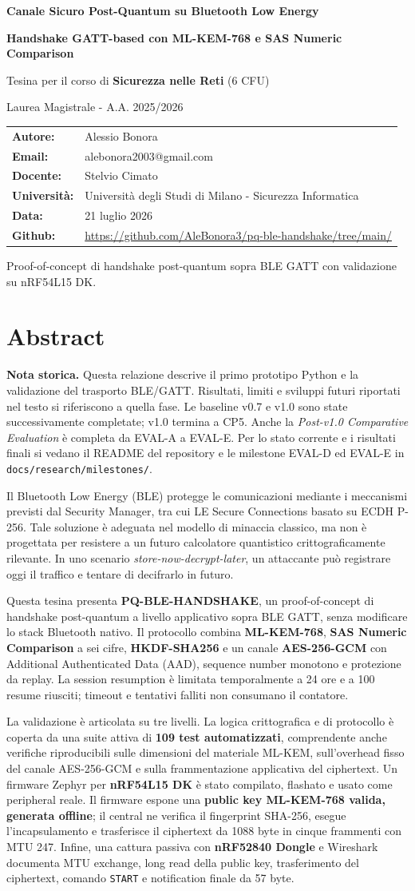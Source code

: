 \documentclass[11pt,a4paper]{article}
\makeatletter
\newcommand{\Course}{Sicurezza nelle Reti}
\newcommand{\Professor}{Stelvio Cimato}
\newcommand{\University}{Universit\`a degli Studi di Milano - Sicurezza Informatica}
\newcommand{\AcademicYear}{2025/2026}
\newcommand{\Student}{Alessio Bonora}
\newcommand{\StudentEmail}{alebonora2003@gmail.com}
\newcommand{\ProjectTitle}{Canale Sicuro Post-Quantum su Bluetooth Low Energy}
\newcommand{\ProjectSubtitle}{Handshake GATT-based con ML-KEM-768 e SAS Numeric Comparison}
\newcommand{\ProjectDate}{21 luglio 2026}
\newcommand{\ProjectRepo}{\url{https://github.com/AleBonora3/pq-ble-handshake/tree/main/}}
\newcommand{\makeprojecttitle}{%
\begin{titlepage}
  \centering
  \vspace*{1.5cm}
  {\Huge\bfseries\color{Primary}\ProjectTitle\par}
  \vspace{0.5cm}
  {\Large\bfseries\ProjectSubtitle\par}
  \vspace{1.4cm}
  {\large Tesina per il corso di \textbf{\Course} (6 CFU)\par}
  \vspace{0.2cm}
  {\large Laurea Magistrale - A.A. \AcademicYear\par}
  \vspace{1.2cm}
  \begin{tcolorbox}[width=0.82\textwidth,colback=SoftBg,colframe=Primary!45]
    \begin{tabularx}{\textwidth}{@{}lX@{}}
      \textbf{Autore:} & \Student \\
      \textbf{Email:} & \StudentEmail \\
      \textbf{Docente:} & \Professor \\
      \textbf{Universit\`a:} & \University \\
      \textbf{Data:} & \ProjectDate \\
      \textbf{Github:} & \ProjectRepo \\
    \end{tabularx}
  \end{tcolorbox}
  \vfill
  {\small Proof-of-concept di handshake post-quantum sopra BLE GATT con validazione su nRF54L15 DK.\par}
\end{titlepage}
}
\makeatother
\begin{document}
\makeprojecttitle
{}
\section*{Abstract}

\noindent\textbf{Nota storica.} Questa relazione descrive il primo prototipo
Python e la validazione del trasporto BLE/GATT. Risultati, limiti e sviluppi
futuri riportati nel testo si riferiscono a quella fase. Le baseline v0.7 e
v1.0 sono state successivamente completate; v1.0 termina a CP5. Anche la
\emph{Post-v1.0 Comparative Evaluation} è completa da EVAL-A a EVAL-E.
Per lo stato corrente e i risultati finali si vedano il README del repository
e le milestone EVAL-D ed EVAL-E in \texttt{docs/research/milestones/}.

Il Bluetooth Low Energy (BLE) protegge le comunicazioni mediante i
meccanismi previsti dal Security Manager, tra cui LE Secure Connections
basato su ECDH P-256. Tale soluzione è adeguata nel modello di minaccia
classico, ma non è progettata per resistere a un futuro calcolatore
quantistico crittograficamente rilevante. In uno scenario
\emph{store-now-decrypt-later}, un attaccante può registrare oggi il
traffico e tentare di decifrarlo in futuro.

Questa tesina presenta \textbf{PQ-BLE-HANDSHAKE}, un proof-of-concept di
handshake post-quantum a livello applicativo sopra BLE GATT, senza
modificare lo stack Bluetooth nativo. Il protocollo combina
\textbf{ML-KEM-768}, \textbf{SAS Numeric Comparison} a sei cifre,
\textbf{HKDF-SHA256} e un canale \textbf{AES-256-GCM} con Additional
Authenticated Data (AAD), sequence number monotono e protezione da replay.
La session resumption è limitata temporalmente a 24 ore e a 100 resume
riusciti; timeout e tentativi falliti non consumano il contatore.

La validazione è articolata su tre livelli. La logica crittografica e di
protocollo è coperta da una suite attiva di \textbf{109 test automatizzati}, comprendente anche verifiche
riproducibili sulle dimensioni del materiale ML-KEM, sull'overhead
fisso del canale AES-256-GCM e sulla frammentazione applicativa
del ciphertext.
Un firmware Zephyr per \textbf{nRF54L15 DK} è stato compilato, flashato e
usato come peripheral reale. Il firmware espone una \textbf{public key
ML-KEM-768 valida, generata offline}; il central ne verifica il fingerprint
SHA-256, esegue l'incapsulamento e trasferisce il ciphertext da 1088 byte in
cinque frammenti con MTU 247. Infine, una cattura passiva con
\textbf{nRF52840 Dongle} e Wireshark documenta MTU exchange, long read della
public key, trasferimento del ciphertext, comando \texttt{START} e
notification finale da 57 byte.
\end{document}
